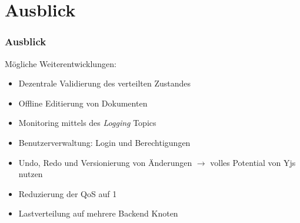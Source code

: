 \section{Ausblick}
\begin{frame}
    \frametitle{Ausblick}
    Mögliche Weiterentwicklungen:
    \begin{itemize}
        \item Dezentrale Validierung des verteilten Zustandes
        \item Offline Editierung von Dokumenten
        \item Monitoring mittels des \textit{Logging} Topics
        \item Benutzerverwaltung: Login und Berechtigungen
        \item Undo, Redo und Versionierung von Änderungen $\rightarrow$ volles Potential von Yjs nutzen
        \item Reduzierung der QoS auf 1
        \item Lastverteilung auf mehrere Backend Knoten
    \end{itemize}
\end{frame}
